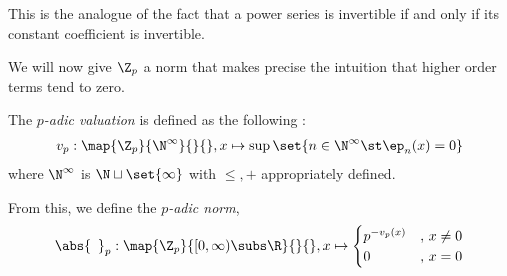 \begin{rmk}
 
  This is the analogue of the fact that a power series is invertible 
  if and only if its constant coefficient is invertible. 
\end{rmk}

We will now give $\Z_p$ a norm that makes precise 
the intuition that higher order terms tend to zero. 

%   
% 

\begin{dfn}
  
  The \emph{$p$-adic valuation} is defined as the following : 
  \begin{align*}
    v_p : \map{\Z_p}{\N^\infty}{}{}, 
    x \mapsto \sup\set{n \in \N^\infty \st \ep_n(x) = 0}
  \end{align*}
  where $\N^\infty$ is $\N\sqcup\set{\infty}$ with 
  $\leq, +$ appropriately defined.

  From this, we define the \emph{$p$-adic norm}, 
  \begin{align*}
    \abs{\hspace{5pt}}_p : \map{\Z_p}{[0,\infty)\subs \R}{}{}, 
    x \mapsto \begin{cases}
      p^{-v_p(x)} &,\, x \neq 0 \\
      0 &,\, x = 0
    \end{cases}
  \end{align*}
\end{dfn}

